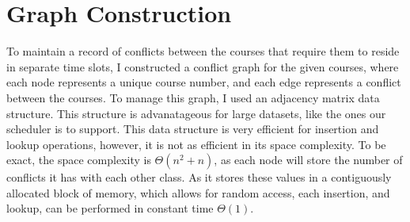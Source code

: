 \documentclass[11pt]{article}
\begin{document}
\section{Graph Construction}


To maintain a record of conflicts between the courses that require them to reside in separate time slots, I constructed a conflict graph for the given courses, where each node represents a unique course number, and each edge represents a conflict between the courses. To manage this graph, I used an adjacency matrix data structure. This structure is advanatageous for large datasets, like the ones our scheduler is to support. This data structure is very efficient for insertion and lookup operations, however, it is not as efficient in its space complexity. To be exact, the space complexity is $\Theta(n^2 + n)$, as each node will store the number of conflicts it has with each other class. As it stores these values in a contiguously allocated block of memory, which allows for random access, each insertion, and lookup, can be performed in constant time $\Theta(1)$.
\end{document}
